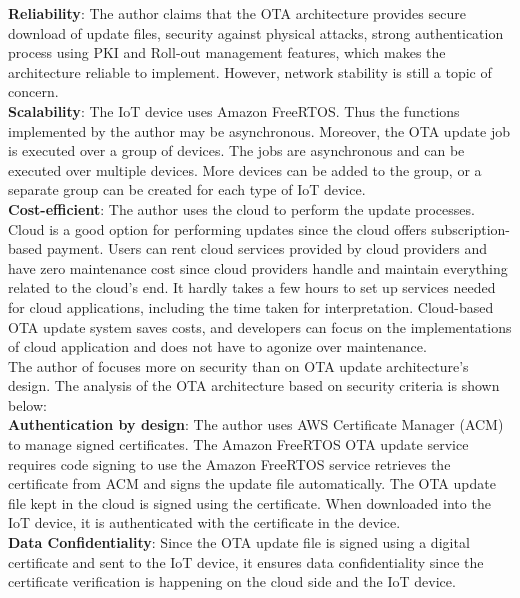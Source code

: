 \documentclass[12pt,a4paper]{article}
\begin{document}
{\textbf{Reliability}: The author claims that the OTA architecture provides secure download of update files, security against physical attacks, strong authentication process using PKI and Roll-out management features, which makes the architecture reliable to implement. However, network stability is still a topic of concern. \cite{r27} \\

\textbf{Scalability}: The IoT device uses Amazon FreeRTOS. Thus the functions implemented by the author may be asynchronous. Moreover, the OTA update job is executed over a group of devices. The jobs are asynchronous and can be executed over multiple devices. More devices can be added to the group, or a separate group can be created for each type of IoT device. \cite{r27} \\

\textbf{Cost-efficient}: The author uses the cloud to perform the update processes. Cloud is a good option for performing updates since the cloud offers subscription-based payment. Users can rent cloud services provided by cloud providers and have zero maintenance cost since cloud providers handle and maintain everything related to the cloud's end. It hardly takes a few hours to set up services needed for cloud applications, including the time taken for interpretation. Cloud-based OTA update system saves costs, and developers can focus on the implementations of cloud application and does not have to agonize over maintenance. \\

The author of \cite{r27} focuses more on security than on OTA update architecture's design. The analysis of the OTA architecture based on security criteria is shown below: \\

\textbf{Authentication by design}: The author uses AWS Certificate Manager (ACM) to manage signed certificates. The Amazon FreeRTOS OTA update service requires code signing to use the Amazon FreeRTOS service retrieves the certificate from ACM and signs the update file automatically. The OTA update file kept in the cloud is signed using the certificate. When downloaded into the IoT device, it is authenticated with the certificate in the device. \cite{r27} \\

\textbf{Data Confidentiality}: Since the OTA update file is signed using a digital certificate and sent to the IoT device, it ensures data confidentiality since the certificate verification is happening on the cloud side and the IoT device. \cite{r27} \\

}
\end{document}
